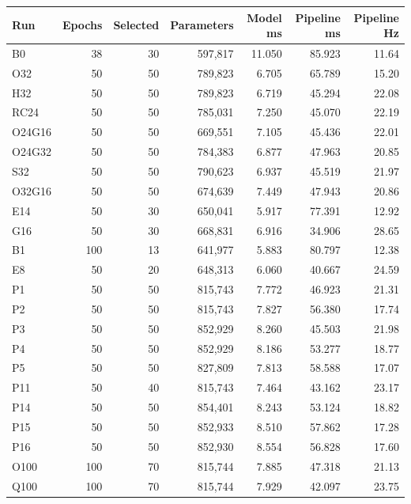\begin{tabular}{lrrrrrr}
\toprule
Run & Epochs & Selected & Parameters & Model ms & Pipeline ms & Pipeline Hz \\
\midrule
B0 & 38 & 30 & 597,817 & 11.050 & 85.923 & 11.64 \\
O32 & 50 & 50 & 789,823 & 6.705 & 65.789 & 15.20 \\
H32 & 50 & 50 & 789,823 & 6.719 & 45.294 & 22.08 \\
RC24 & 50 & 50 & 785,031 & 7.250 & 45.070 & 22.19 \\
O24G16 & 50 & 50 & 669,551 & 7.105 & 45.436 & 22.01 \\
O24G32 & 50 & 50 & 784,383 & 6.877 & 47.963 & 20.85 \\
S32 & 50 & 50 & 790,623 & 6.937 & 45.519 & 21.97 \\
O32G16 & 50 & 50 & 674,639 & 7.449 & 47.943 & 20.86 \\
E14 & 50 & 30 & 650,041 & 5.917 & 77.391 & 12.92 \\
G16 & 50 & 30 & 668,831 & 6.916 & 34.906 & 28.65 \\
B1 & 100 & 13 & 641,977 & 5.883 & 80.797 & 12.38 \\
E8 & 50 & 20 & 648,313 & 6.060 & 40.667 & 24.59 \\
P1 & 50 & 50 & 815,743 & 7.772 & 46.923 & 21.31 \\
P2 & 50 & 50 & 815,743 & 7.827 & 56.380 & 17.74 \\
P3 & 50 & 50 & 852,929 & 8.260 & 45.503 & 21.98 \\
P4 & 50 & 50 & 852,929 & 8.186 & 53.277 & 18.77 \\
P5 & 50 & 50 & 827,809 & 7.813 & 58.588 & 17.07 \\
P11 & 50 & 40 & 815,743 & 7.464 & 43.162 & 23.17 \\
P14 & 50 & 50 & 854,401 & 8.243 & 53.124 & 18.82 \\
P15 & 50 & 50 & 852,933 & 8.510 & 57.862 & 17.28 \\
P16 & 50 & 50 & 852,930 & 8.554 & 56.828 & 17.60 \\
O100 & 100 & 70 & 815,744 & 7.885 & 47.318 & 21.13 \\
Q100 & 100 & 70 & 815,744 & 7.929 & 42.097 & 23.75 \\
\bottomrule
\end{tabular}
